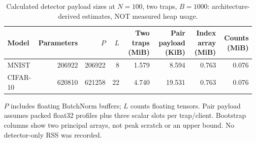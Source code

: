 \begin{table}[t]\centering\footnotesize
\caption{Calculated detector payload sizes at $N=100$, two traps, $B=1000$: architecture-derived estimates, NOT measured heap usage.}\label{tab:payload}
\begin{tabular}{lrrrrrrr}\toprule
Model & Parameters & $P$ & $L$ & Two traps (MiB) & Pair payload (KiB) & Index array (MiB) & Counts (MiB) \\ \midrule
MNIST & 206922 & 206922 & 8 & 1.579 & 8.594 & 0.763 & 0.076 \\
CIFAR-10 & 620810 & 621258 & 22 & 4.740 & 19.531 & 0.763 & 0.076 \\
\bottomrule\end{tabular}
\par\smallskip\begin{minipage}{0.96\textwidth}\scriptsize $P$ includes floating BatchNorm buffers; $L$ counts floating tensors. Pair payload assumes packed float32 profiles plus three scalar slots per trap/client. Bootstrap columns show two principal arrays, not peak scratch or an upper bound. No detector-only RSS was recorded.\end{minipage}\end{table}
